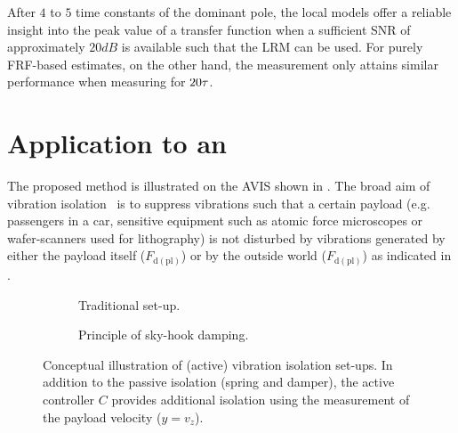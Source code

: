 \begin{guideline}
After $4$ to $5$ time constants of the dominant pole, the local models offer a reliable insight into the peak value of a transfer function when a sufficient \gls{SNR} of approximately $20\unit{dB}$ is available such that the \gls{LRM} can be used.
For purely \gls{FRF}-based estimates, on the other hand, the measurement only attains similar performance when measuring for $20\tau_{}$.
\end{guideline}

\section{Application to an }
\label{sec:lrmhinf:measurement}
The proposed method is illustrated on the \gls{AVIS} shown in .
The broad aim of vibration isolation~\citep{Karnopp1995,Collette2011} is to suppress vibrations such that a certain payload (e.g. passengers in a car, sensitive equipment such as atomic force microscopes or wafer-scanners used for lithography) is not disturbed by vibrations generated by either the payload itself ($F_{\mathrm{d(pl)}}$) or by the outside world ($F_{\mathrm{d(pl)}}$) as indicated in .

\begin{figure}
 \centering
  \setlength{\figurewidth}{0.45\columnwidth}
  \begin{subfigure}[b]{0.49\columnwidth}
    
    \caption{Traditional set-up.}  
    \label{fig:lrmhinf:vibration-isolation:traditional}
  \end{subfigure}
  \begin{subfigure}[b]{0.49\columnwidth}
    
    \caption{Principle of sky-hook damping.}  
    \label{fig:lrmhinf:vibration-isolation:skyhook}
  \end{subfigure}
  \caption[Vibration isolation set-ups (traditional, sky-hook dampinng)]{Conceptual illustration of (active) vibration isolation set-ups. In addition to the passive isolation (spring and damper), the active controller $C$ provides additional isolation using the measurement of the payload velocity ($y=v_z$).
  }
  \label{fig:lrmhinf:vibration-isolation}
\end{figure}

